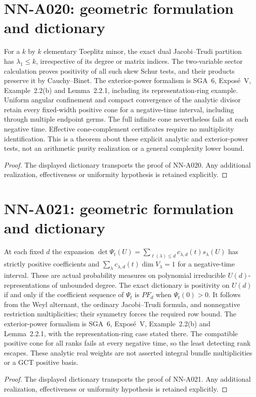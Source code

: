 \section{NN-A020: geometric formulation and dictionary}
\begin{geometricstatement}[NN-A020]
For a $k$ by $k$ elementary Toeplitz minor, the exact dual Jacobi--Trudi partition has $\lambda_1\le k$, irrespective of its degree or matrix indices. The two-variable sector calculation proves positivity of all such skew Schur tests, and their products preserve it by Cauchy--Binet. The exterior-power formalism is SGA~6, Expos\'e~V, Example~2.2(b) and Lemma~2.2.1, including its representation-ring example. Uniform angular confinement and compact convergence of the analytic divisor retain every fixed-width positive cone for a negative-time interval, including through multiple endpoint germs. The full infinite cone nevertheless fails at each negative time. Effective cone-complement certificates require no multiplicity identification. This is a theorem about these explicit analytic and exterior-power tests, not an arithmetic purity realization or a general complexity lower bound.
\end{geometricstatement}
\begin{proof} The displayed dictionary transports the proof of NN-A020. Any additional realization, effectiveness or uniformity hypothesis is retained explicitly.\end{proof}


\section{NN-A021: geometric formulation and dictionary}
\begin{geometricstatement}[NN-A021]
At each fixed $d$ the expansion $\det\Psi_t(U)=\sum_{\ell(\lambda)\le d}c_{\lambda,d}(t)s_\lambda(U)$ has strictly positive coefficients and $\sum_\lambda c_{\lambda,d}(t)\dim V_\lambda=1$ for a negative-time interval. These are actual probability measures on polynomial irreducible $U(d)$-representations of unbounded degree. The exact dictionary is positivity on $U(d)$ if and only if the coefficient sequence of $\Psi_t$ is $PF_d$ when $\Psi_t(0)>0$. It follows from the Weyl alternant, the ordinary Jacobi--Trudi formula, and nonnegative restriction multiplicities; their symmetry forces the required row bound. The exterior-power formalism is SGA~6, Expos\'e~V, Example~2.2(b) and Lemma~2.2.1, with the representation-ring case stated there. The compatible positive cone for all ranks fails at every negative time, so the least detecting rank escapes. These analytic real weights are not asserted integral bundle multiplicities or a GCT positive basis.
\end{geometricstatement}
\begin{proof} The displayed dictionary transports the proof of NN-A021. Any additional realization, effectiveness or uniformity hypothesis is retained explicitly.\end{proof}



